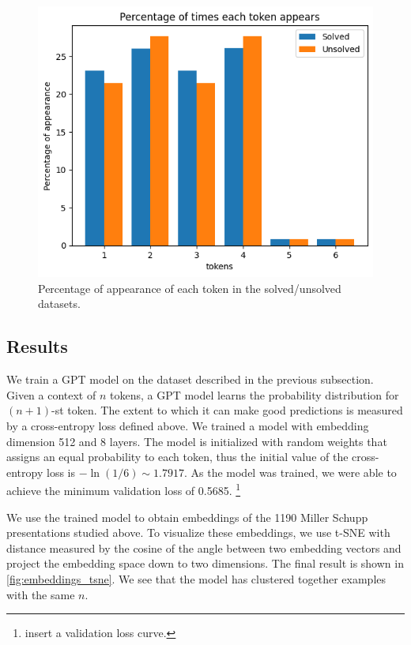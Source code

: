 \begin{figure}
	\centering
	\includegraphics[scale=0.6]{fig/tokens_hist.png}
	\caption{Percentage of appearance of each token in the solved/unsolved datasets. }
	\label{fig:tokens_hist}
\end{figure}

\subsection{Results}
We train a GPT model on the dataset described in the previous subsection. Given a context of $n$ tokens, a GPT model learns the probability distribution for $(n+1)$-st token. The extent to which it can make good predictions is measured by a cross-entropy loss defined above. We trained a model with embedding dimension 512 and 8 layers. The model is initialized with random weights that assigns an equal probability to each token, thus the initial value of the cross-entropy loss is $-\ln(1/6) \sim 1.7917$. As the model was trained, we were able to achieve the minimum validation loss of 0.5685.
\footnote{insert a validation loss curve.}

We use the trained model to obtain embeddings of the 1190 Miller Schupp presentations studied above. To visualize these embeddings, we use t-SNE with distance measured by the cosine of the angle between two embedding vectors and project the embedding space down to two dimensions. The final result is shown in \autoref{fig:embeddings_tsne}. We see that the model has clustered together examples with the same $n$.

